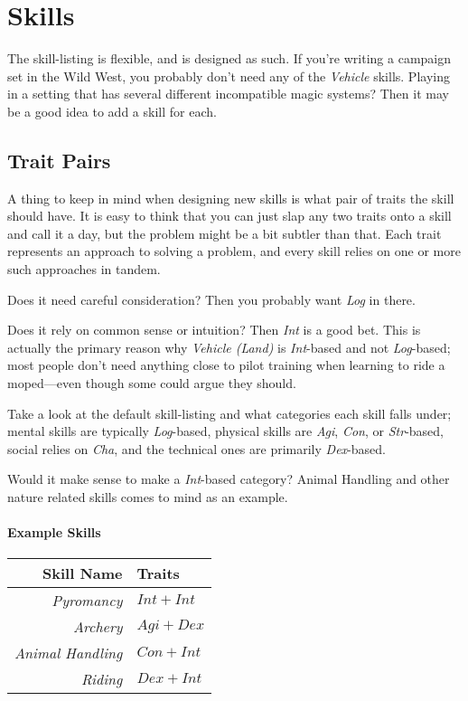 \section{Skills}
The skill-listing is flexible, and is designed as such.
If you're writing a campaign set in the Wild West, you probably don't need any of the \textit{Vehicle} skills.
Playing in a setting that has several different incompatible magic systems? Then it may be a good idea to add a skill for each.

\subsection{Trait Pairs}
A thing to keep in mind when designing new skills is what pair of traits the skill should have.
It is easy to think that you can just slap any two traits onto a skill and call it a day, but the problem might be a bit subtler than that.
Each trait represents an approach to solving a problem, and every skill relies on one or more such approaches in tandem.

Does it need careful consideration? Then you probably want \textit{Log} in there.

Does it rely on common sense or intuition? Then \textit{Int} is a good bet.
This is actually the primary reason why \textit{Vehicle (Land)} is \textit{Int}-based and not \textit{Log}-based; most people don't need anything close to pilot training when learning to ride a moped---even though some could argue they should.

Take a look at the default skill-listing and what categories each skill falls under; mental skills are typically \textit{Log}-based, physical skills are \textit{Agi}, \textit{Con}, or \textit{Str}-based, social relies on \textit{Cha}, and the technical ones are primarily \textit{Dex}-based.

Would it make sense to make a \textit{Int}-based category? Animal Handling and other nature related skills comes to mind as an example.

\paragraph{Example Skills}
\begin{center}
\begin{tabular}{r|l}
    \textbf{Skill Name}      & \textbf{Traits} \\\hline
    \textit{Pyromancy}       & $Int + Int$\\
    \textit{Archery}         & $Agi + Dex$\\
    \textit{Animal Handling} & $Con + Int$\\
    \textit{Riding}          & $Dex + Int$\\
\end{tabular}
\end{center}

